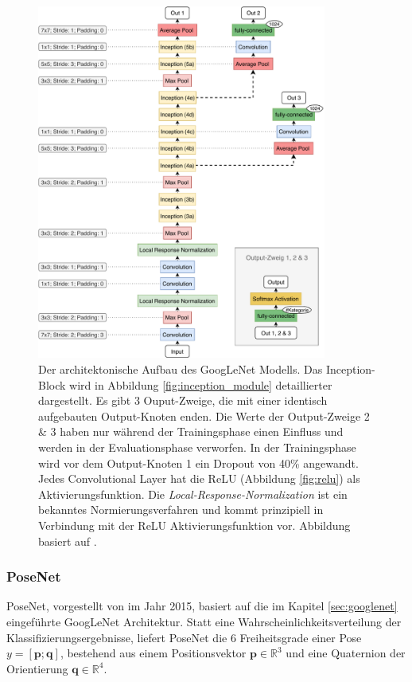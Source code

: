 \vspace*{\fill}
	 \begin{figure}[H]
		\centering
		\includegraphics[width=0.85\textwidth]{images/googlenet/googlenet_diagram.pdf}
		\caption{Der architektonische Aufbau des GoogLeNet Modells. Das Inception-Block wird in Abbildung \ref{fig:inception_module} detaillierter dargestellt. Es gibt 3 Ouput-Zweige, die mit einer identisch aufgebauten Output-Knoten enden. Die Werte der Output-Zweige 2 \& 3 haben nur während der Trainingsphase einen Einfluss und werden in der Evaluationsphase verworfen. In der Trainingsphase wird vor dem Output-Knoten 1 ein Dropout von 40\% angewandt. Jedes Convolutional Layer hat die ReLU (Abbildung \ref{fig:relu}) als Aktivierungsfunktion. Die \textit{Local-Response-Normalization} \cite{krizhevskyImageNetClassificationDeep2012a} ist ein bekanntes Normierungsverfahren und kommt prinzipiell in Verbindung mit der ReLU Aktivierungsfunktion vor. Abbildung basiert auf \cite{szegedyGoingDeeperConvolutions2015}.}
		\label{fig:googlenet}
	\end{figure}
\subsubsection{PoseNet}
\label{sec:posenet}
PoseNet, vorgestellt von \citet{kendallPoseNetConvolutionalNetwork2015} im Jahr 2015, basiert auf die im Kapitel \ref{sec:googlenet} eingeführte GoogLeNet Architektur. Statt eine Wahrscheinlichkeitsverteilung der Klassifizierungsergebnisse, liefert PoseNet die 6 Freiheitsgrade einer Pose $y = [\pmb{p};\pmb{q}]$, bestehend aus einem Positionsvektor $\pmb{p} \in  \mathbb{R}^{3}$ und eine Quaternion der Orientierung $ \pmb{q} \in  \mathbb{R}^{4}$.

